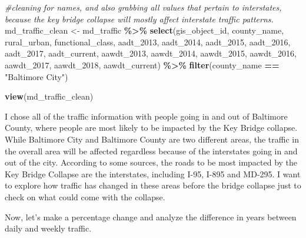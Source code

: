\documentclass[
]{article}
\newenvironment{Shaded}{\begin{snugshade}}{\end{snugshade}}
\newcommand{\CommentTok}[1]{\textcolor[rgb]{0.56,0.35,0.01}{\textit{#1}}}
\newcommand{\FunctionTok}[1]{\textcolor[rgb]{0.13,0.29,0.53}{\textbf{#1}}}
\newcommand{\NormalTok}[1]{#1}
\newcommand{\OtherTok}[1]{\textcolor[rgb]{0.56,0.35,0.01}{#1}}
\newcommand{\SpecialCharTok}[1]{\textcolor[rgb]{0.81,0.36,0.00}{\textbf{#1}}}
\newcommand{\StringTok}[1]{\textcolor[rgb]{0.31,0.60,0.02}{#1}}
\begin{document}
\begin{Shaded}
\begin{Highlighting}[]
\CommentTok{\#cleaning for names, and also grabbing all values that pertain to interstates, because the key bridge collapse will mostly affect interstate traffic patterns. }
\NormalTok{md\_traffic\_clean }\OtherTok{\textless{}{-}}\NormalTok{ md\_traffic }\SpecialCharTok{\%\textgreater{}\%} 
  \FunctionTok{select}\NormalTok{(gis\_object\_id, county\_name, rural\_urban, functional\_class, aadt\_2013, aadt\_2014, aadt\_2015, aadt\_2016, aadt\_2017, aadt\_current, aawdt\_2013, aawdt\_2014, aawdt\_2015, aawdt\_2016, aawdt\_2017, aawdt\_2018, aawdt\_current) }\SpecialCharTok{\%\textgreater{}\%} 
  \FunctionTok{filter}\NormalTok{(county\_name }\SpecialCharTok{==} \StringTok{"Baltimore City"}\NormalTok{)}

\FunctionTok{view}\NormalTok{(md\_traffic\_clean)}
\end{Highlighting}
\end{Shaded}

I chose all of the traffic information with people going in and out of
Baltimore County, where people are most likely to be impacted by the Key
Bridge collapse. While Baltimore City and Baltimore County are two
different areas, the traffic in the overall area will be affected
regardless because of the interstates going in and out of the city.
According to some sources, the roads to be most impacted by the Key
Bridge Collapse are the interstates, including I-95, I-895 and MD-295. I
want to explore how traffic has changed in these areas before the bridge
collapse just to check on what could come with the collapse.

Now, let's make a percentage change and analyze the difference in years
between daily and weekly traffic.
\end{document}
